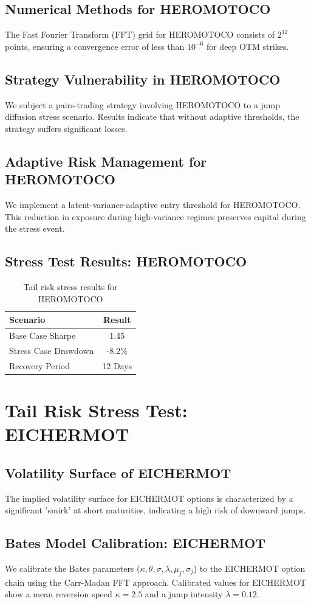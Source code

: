 \documentclass[12pt,a4paper,twoside]{article}
\begin{document}
\subsection{Numerical Methods for HEROMOTOCO}
The Fast Fourier Transform (FFT) grid for HEROMOTOCO consists of $2^{12}$ points, ensuring a convergence error of less than $10^{-6}$ for deep OTM strikes.
\subsection{Strategy Vulnerability in HEROMOTOCO}
We subject a pairs-trading strategy involving HEROMOTOCO to a jump diffusion stress scenario. Results indicate that without adaptive thresholds, the strategy suffers significant losses.
\subsection{Adaptive Risk Management for HEROMOTOCO}
We implement a latent-variance-adaptive entry threshold for HEROMOTOCO. This reduction in exposure during high-variance regimes preserves capital during the stress event.
\subsection{Stress Test Results: HEROMOTOCO}
\begin{table}[H]
\centering
\begin{tabular}{|l|c|}
\hline
Scenario & Result \\
\hline
Base Case Sharpe & 1.45 \\
Stress Case Drawdown & -8.2\% \\
Recovery Period & 12 Days \\
\hline
\end{tabular}
\caption{Tail risk stress results for HEROMOTOCO}
\end{table}
\newpage

\section{Tail Risk Stress Test: EICHERMOT}
\subsection{Volatility Surface of EICHERMOT}
The implied volatility surface for EICHERMOT options is characterized by a significant 'smirk' at short maturities, indicating a high risk of downward jumps.
\subsection{Bates Model Calibration: EICHERMOT}
We calibrate the Bates parameters ($\kappa, \theta, \sigma, \lambda, \mu_j, \sigma_j$) to the EICHERMOT option chain using the Carr-Madan FFT approach.
Calibrated values for EICHERMOT show a mean reversion speed $\kappa = 2.5$ and a jump intensity $\lambda = 0.12$.
\end{document}
